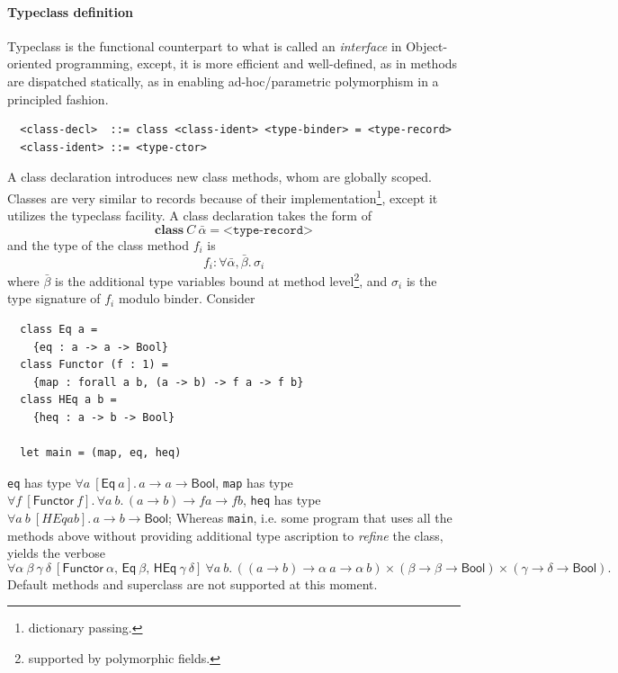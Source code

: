 \documentclass[a4paper, 11pt]{article}
\theoremstyle{remark}\newtheorem*{remark}{Remark}
\theoremstyle{definition}\newtheorem*{definition}{Definition}
\begin{document}
\paragraph{Typeclass definition}
Typeclass is the functional counterpart to what is called an \emph{interface} in Object-oriented
programming, except, it is more efficient and well-defined, as in methods are dispatched statically,
as in enabling ad-hoc/parametric polymorphism in a principled fashion.
\begin{verbatim}
  <class-decl>  ::= class <class-ident> <type-binder> = <type-record>
  <class-ident> ::= <type-ctor>
\end{verbatim}
A class declaration introduces new class methods, whom are globally scoped. Classes are very similar to
records because of their implementation\footnote{dictionary passing.}, except it utilizes the typeclass
facility. A class declaration takes the form of
\[
  \mathbf{class}\ C\ \bar{\alpha} = \texttt{<type-record>}
\]
and the type of the class method \(f_i\) is
\[
  f_i : \forall \bar{\alpha}, \bar{\beta}.\, \sigma_i
\]
where \(\bar{\beta}\) is the additional type variables bound at method level\footnote{supported by polymorphic fields.}, and \(\sigma_i\)
is the type signature of \(f_i\) modulo binder.
Consider
\begin{verbatim}
  class Eq a =
    {eq : a -> a -> Bool}
  class Functor (f : 1) =
    {map : forall a b, (a -> b) -> f a -> f b}
  class HEq a b =
    {heq : a -> b -> Bool}

  let main = (map, eq, heq)

\end{verbatim}

\texttt{eq} has type \(\forall a\ [\mathsf{Eq}\ a].\, a\to a\to \mathsf{Bool}\), \texttt{map} has type
\(\forall f\ [\mathsf{Functor}\ f].\, \forall a\ b.\, (a\to b)\to f a\to f b\), \texttt{heq} has type
\(\forall a\ b\ [HEq a b].\, a\to b\to \mathsf{Bool}\); Whereas \texttt{main}, i.e. some program
that uses all the methods above without providing additional type ascription to \emph{refine} the class, yields the verbose
\[
  \forall \alpha\ \beta\ \gamma\ \delta\
  [\mathsf{Functor\ \alpha},\,\mathsf{Eq\ \beta},\,\mathsf{HEq}\ \gamma\ \delta]\
  \forall a\ b.\, ((a\to b)\to \alpha\ a\to \alpha\ b)\times
  (\beta\to\beta\to \mathsf{Bool}) \times
  (\gamma\to\delta\to \mathsf{Bool}).
\]
Default methods and superclass are not supported at this moment.
\end{document}
